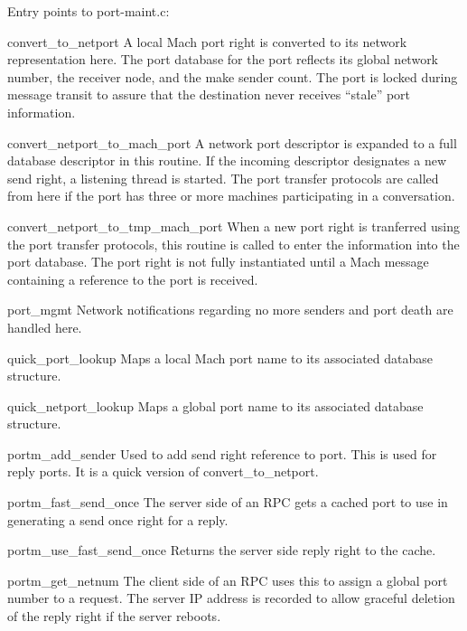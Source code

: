 Entry points to port-maint.c:
\begin{description}
\item {convert\_to\_netport}
A local Mach port right is converted to its network representation here.
The port database for the port reflects its global network number, the
receiver node, and the make sender count.  The port is locked during
message transit to assure that the destination never receives ``stale''
port information.

\item {convert\_netport\_to\_mach\_port}
A network port descriptor is expanded to a full database descriptor in
this routine.  If the incoming descriptor designates a new send right,
a listening thread is started.  The port transfer protocols are called
from here if the port has three or more machines participating in a
conversation.

\item {convert\_netport\_to\_tmp\_mach\_port}
When a new port right is tranferred using the port transfer protocols, this
routine is called to enter the information into the port database.
The port right is not fully instantiated until a Mach message containing
a reference to the port is received.

\item {port\_mgmt}
Network notifications regarding no more senders and port death are
handled here.

\item {quick\_port\_lookup}
Maps a local Mach port name to its associated database structure.

\item {quick\_netport\_lookup}
Maps a global port name to its associated database structure.

\item {portm\_add\_sender}
Used to add send right reference to port.  This is used for reply ports.
It is a quick version of convert\_to\_netport.

\item {portm\_fast\_send\_once}
The server side of an RPC gets a cached port to use in generating
a send once right for a reply.

\item {portm\_use\_fast\_send\_once}
Returns the server side reply right to the cache.

\item {portm\_get\_netnum}
The client side of an RPC uses this to assign a global port number to
a request.  The server IP address is recorded to allow graceful
deletion of the reply right if the server reboots.


\end{description}
